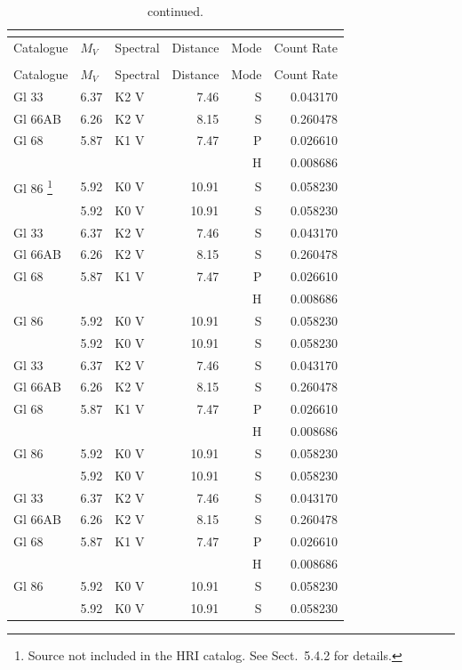 \documentclass{aa}
\begin{document}
\begin{appendix}
\begin{longtable}{lllrrr}
\caption{A long table}\\
\label{ltapp} \\
\hline\hline
Catalogue& $M_{V}$ & Spectral & Distance & Mode & Count Rate \\
\hline
\endfirsthead
\caption{continued.}\\
\hline
Catalogue& $M_{V}$ & Spectral & Distance & Mode & Count Rate \\
\hline
\endhead
\hline
\endfoot
Gl 33    & 6.37 & K2 V & 7.46 & S & 0.043170\\
Gl 66AB  & 6.26 & K2 V & 8.15 & S & 0.260478\\
Gl 68    & 5.87 & K1 V & 7.47 & P & 0.026610\\
         &      &      &      & H & 0.008686\\
Gl 86
\footnote{Source not included in the HRI catalog. See Sect.~5.4.2 for details.}
         & 5.92 & K0 V & 10.91& S & 0.058230\\
                  & 5.92 & K0 V & 10.91& S & 0.058230\\
Gl 33    & 6.37 & K2 V & 7.46 & S & 0.043170\\
Gl 66AB  & 6.26 & K2 V & 8.15 & S & 0.260478\\
Gl 68    & 5.87 & K1 V & 7.47 & P & 0.026610\\
         &      &      &      & H & 0.008686\\
Gl 86    & 5.92 & K0 V & 10.91& S & 0.058230\\            & 5.92 & K0 V & 10.91& S & 0.058230\\
Gl 33    & 6.37 & K2 V & 7.46 & S & 0.043170\\
Gl 66AB  & 6.26 & K2 V & 8.15 & S & 0.260478\\
Gl 68    & 5.87 & K1 V & 7.47 & P & 0.026610\\
         &      &      &      & H & 0.008686\\
Gl 86    & 5.92 & K0 V & 10.91& S & 0.058230\\            & 5.92 & K0 V & 10.91& S & 0.058230\\
Gl 33    & 6.37 & K2 V & 7.46 & S & 0.043170\\
Gl 66AB  & 6.26 & K2 V & 8.15 & S & 0.260478\\
Gl 68    & 5.87 & K1 V & 7.47 & P & 0.026610\\
         &      &      &      & H & 0.008686\\
Gl 86    & 5.92 & K0 V & 10.91& S & 0.058230\\            & 5.92 & K0 V & 10.91& S & 0.058230\\

\end{longtable}
\end{appendix}
\end{document}
